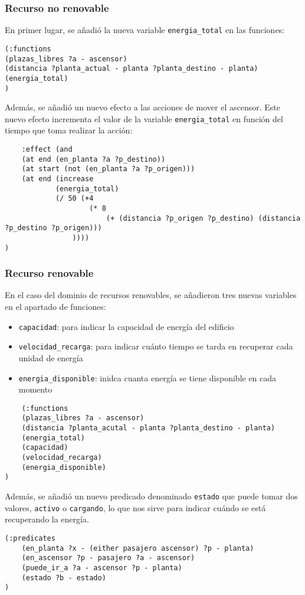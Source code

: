 \documentclass{article}
\begin{document}
\subsubsection{Recurso no renovable}
En primer lugar, se añadió la nueva variable \texttt{energia\_total} en las funciones:
\begin{verbatim}
(:functions
(plazas_libres ?a - ascensor)
(distancia ?planta_actual - planta ?planta_destino - planta)
(energia_total)
)
\end{verbatim}
Además, se añadió un nuevo efecto a las acciones de mover el ascensor. Este nuevo efecto incrementa el valor de la variable \texttt{energia\_total} en función del tiempo que toma realizar la acción:

\begin{verbatim}
    :effect (and
    (at end (en_planta ?a ?p_destino))
    (at start (not (en_planta ?a ?p_origen)))
    (at end (increase
            (energia_total)
            (/ 50 (+4
                    (* 8
                        (+ (distancia ?p_origen ?p_destino) (distancia ?p_destino ?p_origen)))
                ))))
)
\end{verbatim}


\subsubsection{Recurso renovable}
En el caso del dominio de recursos renovables, se añadieron tres nuevas variables en el apartado de funciones:
\begin{itemize}
    \item \texttt{capacidad}: para indicar la capacidad de energía del edificio
    \item \texttt{velocidad\_recarga}: para indicar cuánto tiempo se tarda en recuperar cada unidad de energía
    \item \texttt{energia\_disponible}: inidca cuanta energía se tiene disponible en cada momento
\end{itemize}

\begin{verbatim}
    (:functions
    (plazas_libres ?a - ascensor)
    (distancia ?planta_acutal - planta ?planta_destino - planta)
    (energia_total)
    (capacidad)
    (velocidad_recarga)
    (energia_disponible)
)
\end{verbatim}

Además, se añadió un nuevo predicado denominado \texttt{estado} que puede tomar dos valores, \texttt{activo} o \texttt{cargando}, 
lo que nos sirve para indicar cuándo se está recuperando la energía.
\begin{verbatim}
(:predicates
    (en_planta ?x - (either pasajero ascensor) ?p - planta)
    (en_ascensor ?p - pasajero ?a - ascensor)
    (puede_ir_a ?a - ascensor ?p - planta)
    (estado ?b - estado)
)
\end{verbatim}
\end{document}
